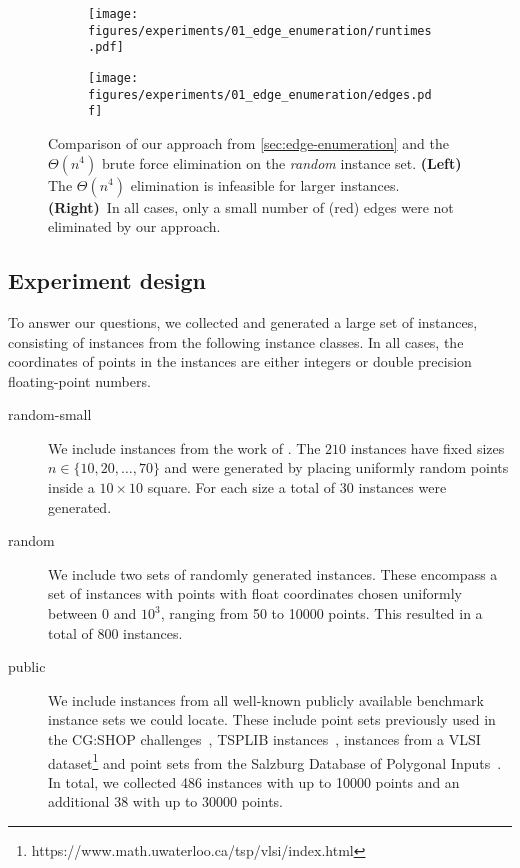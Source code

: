 \begin{figure}
    \begin{subfigure}[c]{0.49\linewidth}
        \centering
        \texttt{[image: figures/experiments/01\_edge\_enumeration/runtimes.pdf]}
    \end{subfigure}\hfill
    \begin{subfigure}[c]{0.49\linewidth}
        \centering
        \texttt{[image: figures/experiments/01\_edge\_enumeration/edges.pdf]}
    \end{subfigure}
    \caption{Comparison of our approach from \cref{sec:edge-enumeration} and the $\Theta(n^4)$ brute force elimination on the \emph{random} instance set.
             \textbf{(Left)} The $\Theta(n^4)$ elimination is infeasible for larger instances.
             \textbf{(Right)}~In all cases, only a small number of (red) edges were not eliminated by our approach.}
    \label{fig:edge-enumeration}
    \label{fig:edge-enumeration-edges}
\end{figure}

\subsection{Experiment design}
To answer our questions, we collected and generated a large set of instances, consisting of instances from the following instance classes.
In all cases, the coordinates of points in the instances are either integers or double precision floating-point numbers.
\begin{description}
  \item[random-small] 
    We include instances from the work of \cite{DBLP:conf/cccg/BrandtGSR14}.
    The $210$ instances have fixed sizes $n\in \{10,20,\dots,70\}$ and were generated by placing uniformly random points inside a $10 \times 10$ square.
    For each size a total of $30$ instances were generated.
  \item[random] 
    We include two sets of randomly generated instances.
    These encompass a set of instances with points with float coordinates chosen uniformly between $0$ and $10^3$,
    ranging from \num{50} to \num{10000} points.
    This resulted in a total of \num{800} instances.
  \item[public] 
    We include instances from all well-known publicly available benchmark instance sets we could locate.
    These include point sets previously used in the CG:SHOP challenges~\cite{demaine2022area,demaine2020computing},
    TSPLIB instances~\cite{reinelt1991}, instances from a VLSI dataset\footnote{https://www.math.uwaterloo.ca/tsp/vlsi/index.html} and
    point sets from the Salzburg Database of Polygonal Inputs~\cite{EDER2020105984}.
    In total, we collected \num{486} instances with up to \num{10000} points and an additional \num{38} with up to \num{30000} points.
\end{description}

